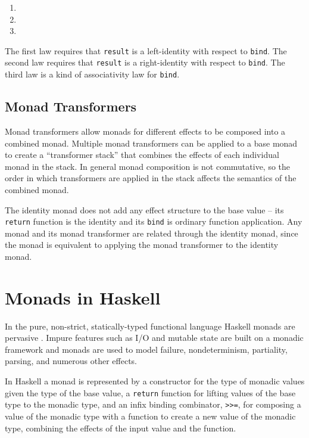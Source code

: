 \documentclass[natbib,10pt]{sigplanconf}
\begin{document}
\begin{enumerate}
\item {}
\item {}
\item {}
\end{enumerate}

The first law requires that \texttt{result} is a left-identity with
respect to \texttt{bind}. The second law requires that \texttt{result} is a
right-identity with respect to \texttt{bind}. The third law is a kind of
associativity law for \texttt{bind}.

\subsection{Monad Transformers}

Monad transformers allow monads for different effects to be composed
into a combined monad.  Multiple monad transformers can be applied to
a base monad to create a ``transformer stack'' that combines the
effects of each individual monad in the stack.  In general monad
composition is not commutative, so the order in which transformers are
applied in the stack affects the semantics of the combined monad.

The identity monad does not add any effect structure to the base value
-- its \texttt{return} function is the identity and its \texttt{bind} is
ordinary function application.  Any monad and its monad transformer
are related through the identity monad, since the monad is equivalent
to applying the monad transformer to the identity monad.

\section{Monads in Haskell}

\newcommand{\hbind}[0]{\texttt{>>=}}

In the pure, non-strict, statically-typed functional language Haskell
monads are pervasive \citep{awkward-squad, haskell98}.  Impure features
such as I/O and mutable state are built on a monadic framework and
monads are used to model failure, nondeterminism, partiality, parsing,
and numerous other effects.

In Haskell a monad is represented by a constructor for the type of
monadic values given the type of the base value, a {\tt return}
function for lifting values of the base type to the monadic type, and
an infix binding combinator, \hbind, for composing a value of the
monadic type with a function to create a new value of the monadic
type, combining the effects of the input value and the function.
\end{document}
